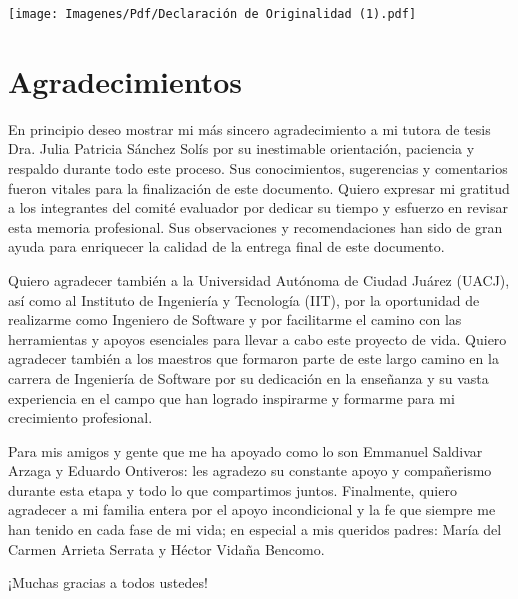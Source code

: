 \documentclass[final, fmstyle, 12pt]{article}
\begin{document}
\newpage
\begin{center}


\texttt{[image: Imagenes/Pdf/Declaración de Originalidad (1).pdf]}

\end{center}


\newpage
\section*{Agradecimientos}
\setlength{\parskip}{1em}
En principio deseo mostrar mi más sincero agradecimiento a mi tutora de tesis Dra. Julia Patricia Sánchez Solís por su inestimable orientación, paciencia y respaldo durante todo este proceso. Sus conocimientos, sugerencias y comentarios fueron vitales para la finalización de este documento.
Quiero expresar mi gratitud a los integrantes del comité evaluador por dedicar su tiempo y esfuerzo en revisar esta memoria profesional. Sus observaciones y recomendaciones han sido de gran ayuda para enriquecer la calidad de la entrega final de este documento.

Quiero agradecer también a la Universidad Autónoma de Ciudad Juárez (UACJ), así como al Instituto de Ingeniería y Tecnología (IIT), por la oportunidad de realizarme como Ingeniero de Software y por facilitarme el camino con las herramientas y apoyos esenciales para llevar a cabo este proyecto de vida.
Quiero agradecer también a los maestros que formaron parte de este largo camino en la carrera de Ingeniería de Software por su dedicación en la enseñanza y su vasta experiencia en el campo que han logrado inspirarme y formarme para mi crecimiento profesional.

Para mis amigos y gente que me ha apoyado como lo son Emmanuel Saldivar Arzaga y Eduardo Ontiveros: les agradezo su constante apoyo y compañerismo durante esta etapa y todo lo que compartimos juntos.
Finalmente, quiero agradecer a mi familia entera por el apoyo incondicional y la fe que siempre me han tenido en cada fase de mi vida; en especial a mis queridos padres: María del Carmen Arrieta Serrata y Héctor Vidaña Bencomo.




¡Muchas gracias a todos ustedes!
\newpage
\end{document}
